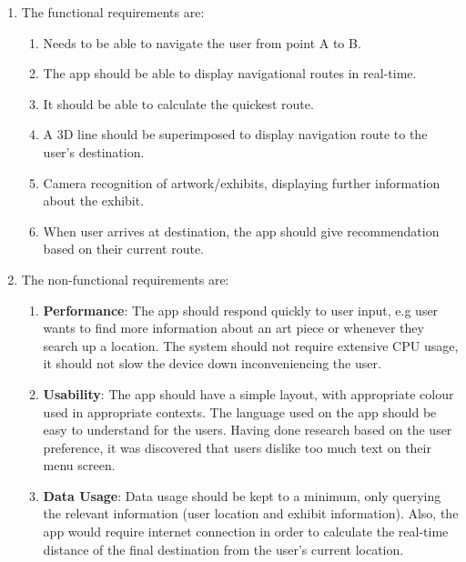 \begin{enumerate}

    \item The functional requirements are:
    \begin{enumerate}
        \item Needs to be able to navigate the user from point A to B.
        \item The app should be able to display navigational routes in real-time.
        \item It should be able to calculate the quickest route.
        \item A 3D line should be superimposed to display navigation route to the user's destination.
        \item Camera recognition of artwork/exhibits, displaying further information about the exhibit.
        \item When user arrives at destination, the app should give recommendation based on their current route.
    \end{enumerate}
    
    \item The non-functional requirements are:
    \begin{enumerate}
        \item \textbf{Performance}: The app should respond quickly to user input, e.g user wants to find more information about an art piece or whenever they search up a location. The system should not require extensive CPU usage, it should not slow the device down inconveniencing the user.
        \item \textbf{Usability}: The app should have a simple layout, with appropriate colour used in appropriate contexts. The language used on the app should be easy to understand for the users. Having done research based on the user preference, it was discovered that users dislike too much text on their menu screen.
        \item \textbf{Data Usage}: Data usage should be kept to a minimum, only querying the relevant information (user location and exhibit information). Also, the app would require internet connection in order to calculate the real-time distance of the final destination from the user's current location.
    \end{enumerate}

\end{enumerate}

